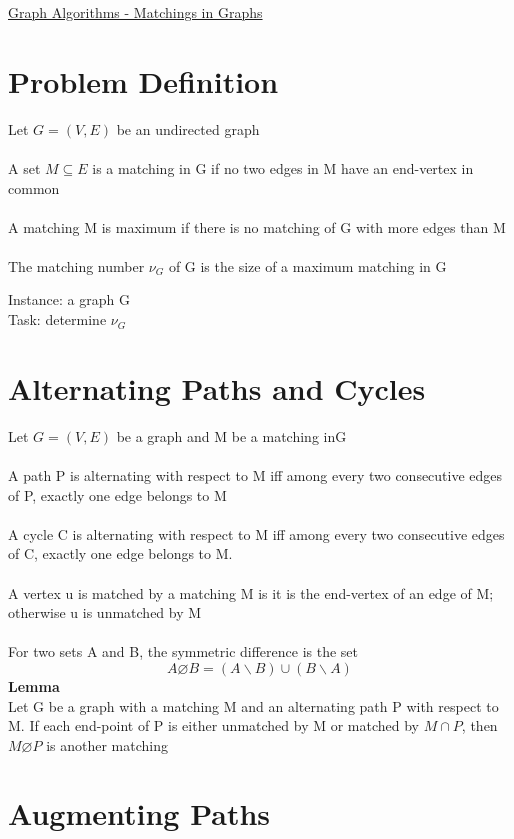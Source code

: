 \documentclass{article}[18pt]
\begin{document}
\begin{center}
\underline{\huge Graph Algorithms - Matchings in Graphs}
\end{center}

\section{Problem Definition}
Let $G=(V,E)$ be an undirected graph\\
\\
A set $M\subseteq E$ is a matching in G if no two edges in M have an end-vertex in common\\
\\
A matching M is maximum if there is no matching of G with more edges than M\\
\\
The matching number $\nu_G$ of G is the size of a maximum matching in G
\begin{defin}[Matching]
Instance: a graph G\\
Task: determine $\nu_G$
\end{defin}
\section{Alternating Paths and Cycles}
Let $G=(V,E)$ be a graph and M be a matching inG\\
\\
A path P is alternating with respect to M iff among every two consecutive edges of P, exactly one edge belongs to M\\
\\
A cycle C is alternating with respect to M iff among every two consecutive edges of C, exactly one edge belongs to M.\\
\\
A vertex u is matched by a matching M is it is the end-vertex of an edge of M; otherwise u is unmatched by M\\
\\
For two sets A and B, the symmetric difference is the set
$$A\varnothing B = (A \backslash B)\cup (B \backslash A)$$
\textbf{Lemma}\\
Let G be a graph with a matching M and an alternating path P with respect to M. If each end-point of P is either unmatched by M or matched by $M\cap P$, then $M \varnothing P$ is another matching
\section{Augmenting Paths} 
\end{document}
